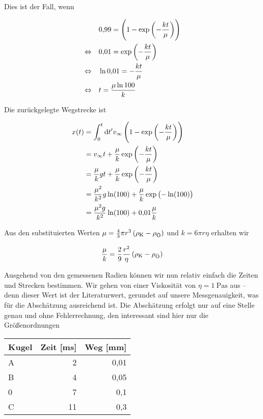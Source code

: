 \documentclass[a4paper,german,12pt,smallheadings]{scrartcl}
\begin{document}
Dies ist der Fall, wenn

\begin{align*}
  &0{,}99 = \del{1 - \exp\del{-\frac{k t}{\mu}}} \\
  \Leftrightarrow \quad &
  0{,}01 = \exp\del{-\frac{k t}{\mu}} \\
  \Leftrightarrow \quad &
  \ln{0{,}01} = -\frac{k t}{\mu} \\
  \Leftrightarrow \quad &
  t = \frac{\mu \ln{100}}{k}\\
\end{align*}

Die zurückgelegte Wegstrecke ist

\begin{align}
  x(t) &= \int_0^t \dif t' v_{\infty} \del{1 - \exp\del{-\frac{k t}{\mu}}} \\
  &= v_\infty t + \frac{\mu}{k} \exp\del{-\frac{k t}{\mu}} \\
  &= \frac{\mu}{k} g t + \frac{\mu}{k} \exp\del{-\frac{k t}{\mu}} \\
  &= \frac{\mu^2}{k^2} g \ln(100) + \frac{\mu}{k} \exp\del{-\ln(100)} \\
  &= \frac{\mu^2g}{k^2} \ln(100) + 0{,}01 \frac{\mu}{k}
\end{align}

Aus den substituierten Werten $\mu = \frac{4}{3} \pi r^3 \del{\rho_\text{K} -
\rho_\text{Ö}}$ und $k = 6 \pi r \eta$ erhalten wir

\begin{equation}
  \frac{\mu}{k} = \frac{2}{9} \frac{r^2}{\eta} \del{ \rho_\text{K} - \rho_\text{Ö} }
\end{equation}

Ausgehend von den gemessenen Radien können wir nun relativ einfach die Zeiten
und Strecken bestimmen. Wir gehen von einer Viskosität von $\eta =
\SI{1}{\pascal \second}$ aus -- denn dieser Wert ist der Literaturwert,
gerundet auf unsere Messgenauigkeit, was für die Abschätzung ausreichend ist.
Die Abschätzung erfolgt nur auf eine Stelle genau und ohne Fehlerrechnung, den
interessant sind hier nur die Größenordnungen

\vspace{0.5 cm}
\begin{tabular}{l|r|r}
  Kugel & Zeit [ms] & Weg [mm] \\
  \hline
  A & 2 & 0{,}01 \\
  B & 4 & 0{,}05 \\
  0 & 7 & 0{,}1 \\
  C & 11 & 0{,}3
\end{tabular}
\vspace{0.5 cm}
\end{document}
